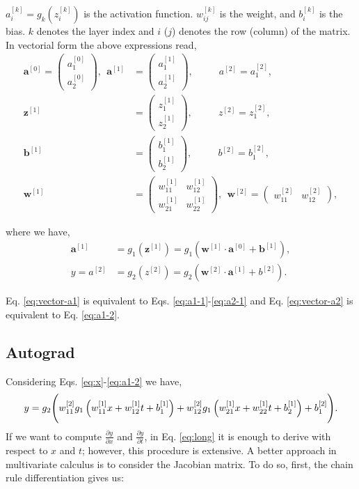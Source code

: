 \documentclass{article}
\begin{document}
$a_i^{[k]}=g_{k}(z_i^{[k]})$ is the activation function. $w_{ij}^{[k]}$ is the weight, and $b_i^{[k]}$ is the bias. $k$ denotes the layer index and $i$ ($j$) denotes the row (column) of the matrix.
In vectorial form the above expressions read,
\begin{align}
\textbf{a}^{[0]} = 
\begin{pmatrix}
a_1^{[0]} \\
a_2^{[0]}
\end{pmatrix}, ~~
\textbf{a}^{[1]} &= 
\begin{pmatrix}
a_1^{[1]} \\
a_2^{[1]}
\end{pmatrix}, ~~~~~~~~~~~~
a^{[2]} = 
a_1^{[2]}, \\
\textbf{z}^{[1]} &= 
\begin{pmatrix}
z_1^{[1]} \\
z_2^{[1]}
\end{pmatrix}, ~~~~~~~~~~~~
z^{[2]} = 
z_1^{[2]}, \\
\textbf{b}^{[1]} &= 
\begin{pmatrix}
b_{1}^{[1]} \\ b_{2}^{[1]}
\end{pmatrix}, ~~~~~~~~~~~~
b^{[2]} = 
b_{1}^{[2]}, \\
\textbf{w}^{[1]} &= 
\begin{pmatrix}
w_{11}^{[1]} & w_{12}^{[1]}    \\
w_{21}^{[1]} & w_{22}^{[1]}
\end{pmatrix}, ~~
\textbf{w}^{[2]} = 
\begin{pmatrix}
w_{11}^{[2]} & w_{12}^{[2]}
\end{pmatrix},
\end{align}

where we have,
\begin{align}
\label{eq:vector-a1}
\textbf{a}^{[1]} &= g_1(\textbf{z}^{[1]}) = g_1\left(\textbf{w}^{[1]}\cdot \textbf{a}^{[0]} + \textbf{b}^{[1]}\right),\\
y = a^{[2]} &= g_2(z^{[2]}) = g_2\left(\textbf{w}^{[2]}\cdot \textbf{a}^{[1]} + b^{[2]}\right). 
\label{eq:vector-a2}
\end{align}

Eq. \eqref{eq:vector-a1} is equivalent to Eqs. \eqref{eq:a1-1}-\eqref{eq:a2-1} and Eq. \eqref{eq:vector-a2} is equivalent to Eq. \eqref{eq:a1-2}.

\subsection{Autograd}
Considering Eqs. \eqref{eq:x}-\eqref{eq:a1-2} we have,
\begin{align}
\label{eq:long}
y = g_2\Bigg{(}w_{11}^{[2]} g_1\left(w_{11}^{[1]} x + w_{12}^{[1]} t + b_1^{[1]}\right) +
             w_{12}^{[2]} g_1\left(w_{21}^{[1]} x + w_{22}^{[1]} t + b_2^{[1]}\right) + b_1^{[2]}\Bigg{)}.
\end{align}
If we want to compute $\frac{\partial y}{\partial x}$ and $\frac{\partial y}{\partial t}$, in Eq. \eqref{eq:long} it is enough to derive with respect to $x$ and $t$; however, this procedure is extensive. A better approach in multivariate calculus is to consider the Jacobian matrix. To do so, first, the chain rule differentiation gives us:
\end{document}
